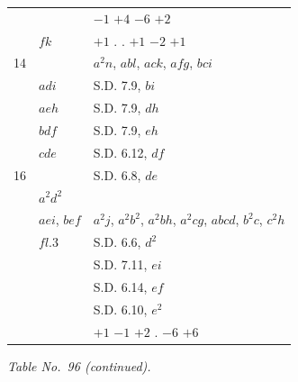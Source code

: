 \documentclass[11pt]{article}
\begin{document}
\begin{center}
\begin{tabular}{lll}
& & $-1$ $+4$ $-6$ $+2$ \\
& $fk$ & $+1$ \quad . \quad . \quad $+1$ $-2$ $+1$ \\
14 & & $a^{2}n$, $abl$, $ack$, $afg$, $bci$ \\
& $adi$ & \quad\quad\quad\quad\quad\quad S.D. 7.9, $bi$ \\
& $aeh$ & \quad\quad\quad\quad\quad\quad S.D. 7.9, $dh$ \\
& $bdf$ & \quad\quad\quad\quad\quad\quad S.D. 7.9, $eh$ \\
& $cde$ & \quad\quad\quad\quad\quad\quad S.D. 6.12, $df$ \\
16 & & \quad\quad\quad\quad\quad\quad S.D. 6.8, $de$ \\
& $a^{2}d^{2}$ & \\
& $aei$, $bef$ & $a^{2}j$, $a^{2}b^{2}$, $a^{2}bh$, $a^{2}cg$, $abcd$, $b^{2}c$, $c^{2}h$ \\
& $fl.3$ & \quad\quad\quad\quad\quad\quad S.D. 6.6, $d^{2}$ \\
& & \quad\quad\quad\quad\quad\quad S.D. 7.11, $ei$ \\
& & \quad\quad\quad\quad\quad\quad S.D. 6.14, $ef$ \\
& & \quad\quad\quad\quad\quad\quad S.D. 6.10, $e^{2}$ \\
& & $+1$ $-1$ $+2$ \quad . \quad $-6$ $+6$ \\
\end{tabular}
\end{center}


\begin{center}
\textit{Table No.\ 96 (continued).}
\end{center}
\end{document}

